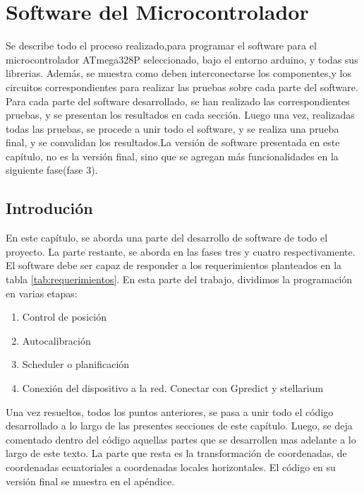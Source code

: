 \renewcommand{\chaptername}{Software del microcontrolador}
\graphicspath{{parte_2/soft_micro/}}
\chapter{Software del Microcontrolador} 
\begin{center}
	\begin{tcolorbox}[colback=gray!5!white, %
		colframe=gray!75!black,
		title= \center{\Large{Resumen}} ]
		Se describe todo el proceso realizado,para programar el software para el microcontrolador ATmega328P seleccionado, bajo el entorno arduino, y todas sus librerias. Además, se muestra como deben interconectarse los componentes,y los circuitos correspondientes para realizar las pruebas sobre cada parte del software. Para cada parte del software desarrollado, se han realizado las correspondientes pruebas, y se presentan los resultados en cada sección. Luego una vez, realizadas todas las pruebas, se procede a unir todo el software, y se realiza una prueba final, y se convalidan los resultados.La versión de software presentada en este capítulo, no es la versión final, sino que se agregan más funcionalidades en la siguiente fase(fase 3).   
		 
	\end{tcolorbox}
\end{center}    
\section{Introdución} 
	En este capítulo, se aborda una parte del desarrollo de software de todo el proyecto. La parte restante, se aborda en las fases tres y cuatro respectivamente. El software debe ser capaz de responder a los requerimientos planteados en la tabla \ref{tab:requerimientos}. En esta parte del trabajo, dividimos la programación en varias etapas:  	
	\begin{enumerate}
		\item Control de posición
		\item Autocalibración
		\item Scheduler o planificación 
		\item Conexión del dispositivo a la red. Conectar con Gpredict y stellarium
	\end{enumerate}
	Una vez resueltos, todos los puntos anteriores, se pasa a unir todo el código desarrollado a lo largo de las presentes secciones de este capítulo. Luego, se deja comentado dentro del código aquellas partes que se desarrollen mas adelante a lo largo de este texto. La parte que resta es la transformación de coordenadas, de coordenadas ecuatoriales a coordenadas locales horizontales.  El código en su versión final se muestra en el apéndice.   

